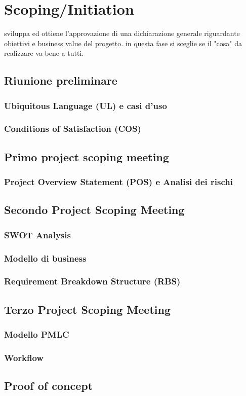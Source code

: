 \chapter{Scoping/Initiation}

sviluppa ed ottiene l'approvazione di una dichiarazione generale riguardante obiettivi e business value del progetto.
in questa fase si sceglie se il "cosa" da realizzare va bene a tutti.


\section{Riunione preliminare}
\subsection{Ubiquitous Language (UL) e casi d'uso}
\subsection{Conditions of Satisfaction (COS)}

\section{Primo project scoping meeting}
\subsection{Project Overview Statement (POS) e Analisi dei rischi}

\section{Secondo Project Scoping Meeting}
\subsection{SWOT Analysis}
\subsection{Modello di business}
\subsection{Requirement Breakdown Structure (RBS)}

\section{Terzo Project Scoping Meeting}
\subsection{Modello PMLC}
\subsection{Workflow}

\section{Proof of concept}

